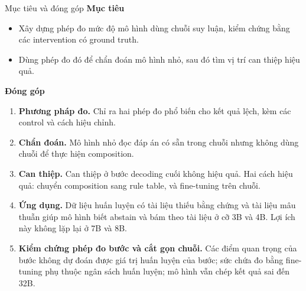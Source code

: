 \documentclass[aspectratio=169,t,10pt]{beamer}
\begin{document}
\begin{frame}{Mục tiêu và đóng góp}
\textbf{Mục tiêu}
\begin{itemize}
  \item Xây dựng phép đo mức độ mô hình dùng chuỗi suy luận, kiểm chứng bằng các intervention có ground truth.
  \item Dùng phép đo đó để chẩn đoán mô hình nhỏ, sau đó tìm vị trí can thiệp hiệu quả.
\end{itemize}
\vspace{4pt}
\textbf{Đóng góp}
\begin{enumerate}
  \item \textbf{Phương pháp đo.} Chỉ ra hai phép đo phổ biến cho kết quả lệch, kèm các control và cách hiệu chỉnh.
  \item \textbf{Chẩn đoán.} Mô hình nhỏ đọc đáp án có sẵn trong chuỗi nhưng không dùng chuỗi để thực hiện composition.
  \item \textbf{Can thiệp.} Can thiệp ở bước decoding cuối không hiệu quả. Hai cách hiệu quả: chuyển composition sang rule table, và fine-tuning trên chuỗi.
  \item \textbf{Ứng dụng.} Dữ liệu huấn luyện có tài liệu thiếu bằng chứng và tài liệu mâu thuẫn giúp mô hình biết abstain và bám theo tài liệu ở cỡ 3B và 4B. Lợi ích này không lặp lại ở 7B và 8B.
  \item \textbf{Kiểm chứng phép đo bước và cắt gọn chuỗi.} Các điểm quan trọng của bước không dự đoán được giá trị huấn luyện của bước; sức chứa đo bằng fine-tuning phụ thuộc ngân sách huấn luyện; mô hình vẫn chép kết quả sai đến 32B.
\end{enumerate}
\end{frame}
\end{document}
